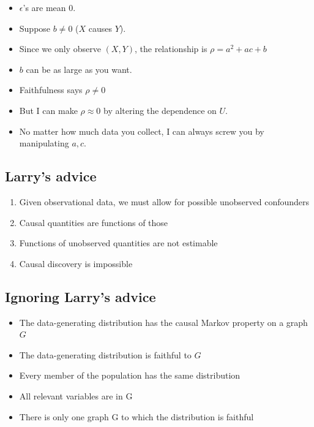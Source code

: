 \documentclass[]{article}
\providecommand{\tightlist}{%
  \setlength{\itemsep}{0pt}\setlength{\parskip}{0pt}}
\begin{document}
\begin{itemize}
\tightlist
\item
  \(\epsilon\)'s are mean 0.
\item
  Suppose \(b\neq 0\) (\(X\) causes \(Y\)).
\item
  Since we only observe \((X,Y)\), the relationship is
  \(\rho=a^2 + ac + b\)
\item
  \(b\) can be as large as you want.
\item
  Faithfulness says \(\rho \neq 0\)
\item
  But I can make \(\rho \approx 0\) by altering the dependence on \(U\).
\item
  No matter how much data you collect, I can always screw you by
  manipulating \(a,c\).
\end{itemize}

\hypertarget{larrys-advice}{%
\subsection{Larry's advice}\label{larrys-advice}}

\begin{enumerate}
\def\labelenumi{\arabic{enumi}.}
\tightlist
\item
  Given observational data, we must allow for possible unobserved
  confounders
\item
  Causal quantities are functions of those
\item
  Functions of unobserved quantities are not estimable
\item
  Causal discovery is impossible
\end{enumerate}

\hypertarget{ignoring-larrys-advice}{%
\subsection{Ignoring Larry's advice}\label{ignoring-larrys-advice}}

\begin{itemize}
\tightlist
\item
  The data-generating distribution has the causal Markov property on a
  graph \(G\)
\item
  The data-generating distribution is faithful to \(G\)
\item
  Every member of the population has the same distribution
\item
  All relevant variables are in G
\item
  There is only one graph G to which the distribution is faithful
\end{itemize}
\end{document}
